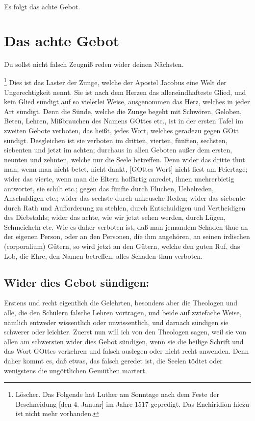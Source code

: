 Es folgt das achte Gebot.

\section{Das achte Gebot}

\begin{schriftzitat}
Du sollst nicht falsch Zeugniß reden wider deinen Nächsten.
\end{schriftzitat}

\footnote{Löscher. Das Folgende hat Luther am Sonntage nach dem Feste der Beschneidung [den 4. Januar] im Jahre 1517 gepredigt. Das Enchiridion hiezu ist nicht mehr vorhanden.} Dies ist das Laster der Zunge, welche der Apostel Jacobus eine Welt der Ungerechtigkeit nennt. Sie ist nach dem Herzen das allersündhafteste Glied, und kein Glied sündigt auf so vielerlei Weise, ausgenommen das Herz, welches in jeder Art sündigt. Denn die Sünde, welche die Zunge begeht mit Schwören, Geloben, Beten, Lehren, Mißbrauchen des Namens GOttes etc., ist in der ersten Tafel im zweiten Gebote verboten, das heißt, jedes Wort, welches geradezu gegen GOtt sündigt. Desgleichen ist sie verboten im dritten, vierten, fünften, sechsten, siebenten und jetzt im achten; durchaus in allen Geboten außer dem ersten, neunten und zehnten, welche nur die Seele betreffen. Denn wider das dritte thut man, wenn man nicht betet, nicht dankt, [GOttes Wort] nicht liest am Feiertage; wider das vierte, wenn man die Eltern hoffärtig anredet, ihnen unehrerbietig antwortet, sie schilt etc.; gegen das fünfte durch Fluchen, Uebelreden, Anschuldigen etc.; wider das sechste durch unkeusche Reden; wider das siebente durch Rath und Aufforderung zu stehlen, durch Entschuldigen und Vertheidigen des Diebstahls; wider das achte, wie wir jetzt sehen werden, durch Lügen, Schmeicheln etc. Wie es daher verboten ist, daß man jemandem Schaden thue an der eigenen Person, oder an den Personen, die ihm angehören, an seinen irdischen (corporalium) Gütern, so wird jetzt an den Gütern, welche den guten Ruf, das Lob, die Ehre, den Namen betreffen, alles Schaden thun verboten.

\subsection{Wider dies Gebot sündigen:}

Erstens und recht eigentlich die Gelehrten, besonders aber die Theologen und alle, die den
Schülern falsche Lehren vortragen, und beide auf zwiefache Weise, nämlich entweder wissentlich oder unwissentlich, und darnach sündigen sie schwerer oder leichter. Zuerst nun will ich von den Theologen sagen, weil sie von allen am schwersten wider dies Gebot sündigen, wenn sie die heilige Schrift und das Wort GOttes verkehren und falsch auslegen oder nicht recht anwenden. Denn daher kommt es, daß etwas, das falsch geredet ist, die Seelen tödtet oder wenigstens die ungöttlichen Gemüthen martert.

